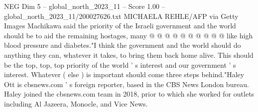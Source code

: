 \begin{textsample}{NEG Dim 5 – global\_north\_2023\_11 – Score 1.00 – global\_north\_2023\_11/200027626.txt}
MICHAELA REHLE/AFP via Getty Images Machikawa said the priority of the Israeli government and the world should be to aid the remaining hostages, many @ @ @ @ @ @ @ @ @ @ like high blood pressure and diabetes."I think the government and the world should do anything they can, whatever it takes, to bring them back home alive.
This should be the top, top, top priority of the world ' s interest and our government ' s interest.
Whatever ( else ) is important should come three steps behind."Haley Ott is cbsnews.com ' s foreign reporter, based in the CBS News London bureau.
Haley joined the cbsnews.com team in 2018, prior to which she worked for outlets including Al Jazeera, Monocle, and Vice News.

\end{textsample}
